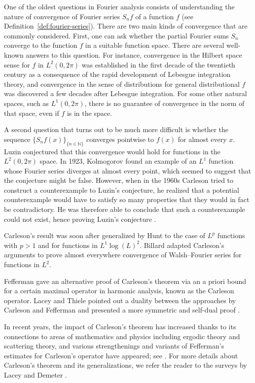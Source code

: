 \documentclass[12pt]{amsart}
\newcommand*{\nat}{\mathbb{N}} %
\theoremstyle{definition}
\theoremstyle{plain}
\begin{document}
One of the oldest questions in Fourier analysis consists of understanding the nature of convergence of Fourier series $S_nf$ of a function $f$ (see Definition~\ref{def:fourier-series}).
There are two main kinds of convergence that are commonly considered. First, one can ask whether the partial Fourier sums $S_n$ converge to the function $f$ in a suitable function
space. There are several well-known answers to this question. For instance, convergence in the Hilbert
space sense for $f$ in $L^2(0,2\pi)$ was established in the first decade of
the twentieth century as a consequence of the rapid development of Lebesgue
integration theory, and convergence in the sense of
distributions for general distributional $f$ was discovered a few decades
after Lebesgue integration. For some other natural spaces, such as
$L^1(0,2\pi)$, there is no guarantee of convergence in the norm of that space,
even if $f$ is in the space.

A second question that turns out to be much more difficult is whether the sequence $\{ S_n f (x)\}_{\{ n \in\nat\}}$ converges pointwise to $f(x)$ for almost every $x$.
Luzin \cite{Luzin13} conjectured that this convergence would hold for functions in the
$L^2(0,2\pi)$ space. In 1923, Kolmogorov found an example \cite{Kolmogorov} of an $L^1$ function whose Fourier series diverges at almost every point, which seemed to suggest that the conjecture might be false. However, when in the 1960s Carleson tried to construct a counterexample to Luzin's conjecture, he realized that a potential counterexample would have to satisfy so many properties that they would in fact be contradictory. He was therefore able to conclude that such a counterexample could not exist, hence proving Luzin's conjecture \cite{carleson}.

Carleson's result was soon after generalized by Hunt \cite{MR238019} to the case of $L^p$ functions with $p>1$ and for functions in $L^1\log(L)^2$. Billard \cite{MR217510} adapted Carleson's arguments to prove almost everywhere convergence of Walsh--Fourier series
for functions in $L^2$.

Fefferman gave an alternative proof of Carleson's theorem \cite{fefferman} via an a priori bound for a certain maximal operator in harmonic analysis, known as the Carleson operator.
Lacey and Thiele pointed out a duality between the approaches by Carleson and Fefferman and presented a more symmetric and self-dual proof \cite{lacey-thiele}.

In recent years, the impact of Carleson's theorem has increased thanks to its connections to areas of mathematics and physics including ergodic theory and scattering theory, and various strengthenings and variants of Fefferman's estimates for Carleson's operator have appeared; see \cite[\S 1]{CarlesonBlueprint}. For more details about Carleson's theorem and its generalizations, we refer the reader to the surveys by Lacey \cite{MR2091007} and Demeter \cite{MR3334208}.
\end{document}
